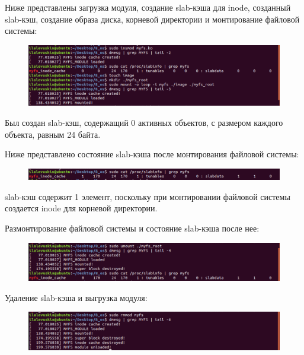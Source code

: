 \documentclass[a4paper,12pt]{article}
\begin{document}
	Ниже представлены загрузка модуля, создание slab-кэша для inode, созданный slab-кэш, создание образа диска, корневой директории и монтирование файловой
	системы:
	
	\begin{figure}[h!]
		\begin{center}
			{\includegraphics[scale = 0.5]{1.png}}
			\label{1}
		\end{center}
	\end{figure}
	
	 Был создан slab-кэш, содержащий 0 активных объектов, с размером каждого объекта, равным 24 байта.
	 
	 
	 Ниже представлено состояние slab-кэша после монтирования файловой системы:
	 
	 \begin{figure}[h!]
	 	\begin{center}
	 		{\includegraphics[scale = 0.5]{2.png}}
	 		\label{2}
	 	\end{center}
	 \end{figure}
	 
	 slab-кэш содержит 1 элемент, поскольку при монтировании файловой системы создается inode для корневой директории.
	 
	 \newpage
	 
	 Размонтирование файловой системы и состояние slab-кэша после нее:
	 
	 \begin{figure}[h!]
	 	\begin{center}
	 		{\includegraphics[scale = 0.5]{3.png}}
	 		\label{3}
	 	\end{center}
	 \end{figure}
	 
	 Удаление slab-кэша и выгрузка модуля:
	 
	 \begin{figure}[h!]
	 	\begin{center}
	 		{\includegraphics[scale = 0.5]{4.png}}
	 		\label{4}
	 	\end{center}
	 \end{figure}
	 
	
\end{document}
